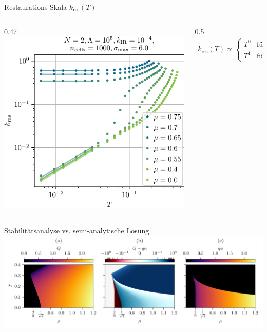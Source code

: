 \begin{frame}{Restaurations-Skala $k_\mathrm{res}(T)$}
	\label{2dqpt}
	\begin{columns}
		\begin{column}{0.47\framewidth}  %
			\centering
			\includegraphics[width=0.47\framewidth]{../gn/figures/T_k_restored.pdf} 
		\end{column}\hspace{.1cm}
		\begin{column}{0.5\framewidth}  %
			\begin{align*}
				k_\mathrm{res}(T)	\propto \begin{cases}
					T^0 &\text{für $\mu>0.6$,}\\
					T^1 &\text{für $\mu<0.6$}
				\end{cases}
			\end{align*}
		\end{column}
	\end{columns}
\end{frame}


\begin{frame}{Stabilitätsanalyse vs. semi-analytische Lösung}
	\label{2dstab}
	\centering
	\includegraphics[width=1.0\framewidth]{../gn/figures/q_stab_vs_min_muT.pdf}
\end{frame}
